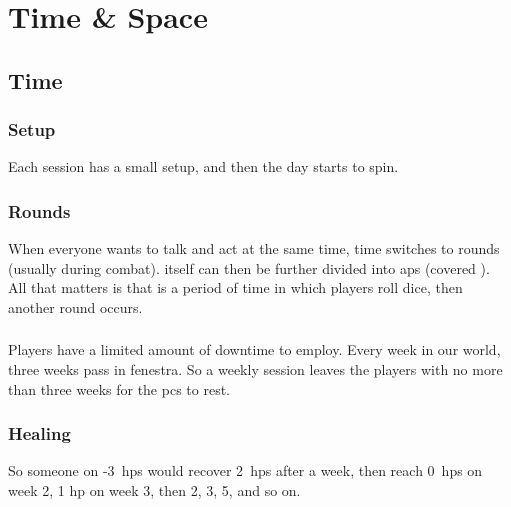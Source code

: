 \pagebreak
\section{Time \& Space}

\begin{multicols}{2}

\subsection{Time}
\label{time}

\subsubsection{Setup}
Each session has a small setup, and then the day starts to spin.



\subsubsection{Rounds}

When everyone wants to talk and act at the same time, time switches to \glspl{round} (usually during combat).
 itself can then be further divided into \glspl{ap} (covered ).
All that matters is that  is a period of time in which players roll dice, then another \gls{round} occurs.

\subsubsection{}
\label{intervals}



\subsubsection{}

Players have a limited amount of \gls{downtime} to employ.
Every week in our world, three weeks pass in \gls{fenestra}.
So a weekly session leaves the players with no more than three weeks for the \glspl{pc} to rest.

\subsubsection{Healing}
\label{healing}

So someone on -3~\glspl{hp} would recover 2~\glspl{hp} after a week, then reach 0~\glspl{hp} on week 2, 1 \gls{hp} on week 3, then 2, 3, 5, and so on.


\end{multicols}
